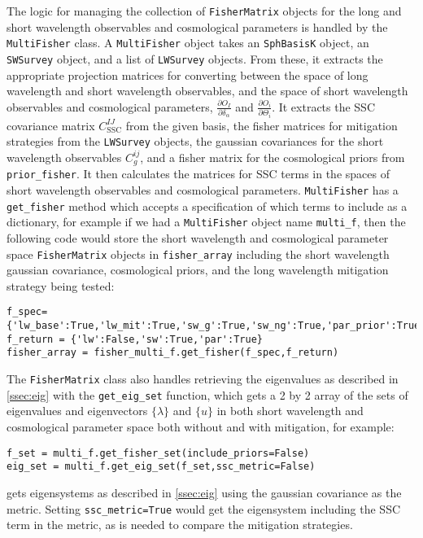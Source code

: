 \documentclass[a4paper,11pt]{article}
\begin{document}
The logic for managing the collection of \texttt{FisherMatrix} objects for the long and short wavelength observables and cosmological parameters is handled by the \texttt{MultiFisher} class. A \texttt{MultiFisher} object takes an \texttt{SphBasisK} object, an \texttt{SWSurvey} object, and a list of \texttt{LWSurvey} objects. From these, it extracts the appropriate projection matrices for converting between the space of long wavelength and short wavelength observables, and the space of short wavelength observables and cosmological parameters, $\frac{\partial O_{I}}{\partial\delta_\alpha}$ and $\frac{\partial O_i}{\partial\Theta_i}$. It extracts the SSC covariance matrix $C^{IJ}_{\text{SSC}}$ from the given basis, the fisher matrices for mitigation strategies from the \texttt{LWSurvey} objects, the gaussian covariances for the short wavelength observables $C^{ij}_g$, and a fisher matrix for the cosmological priors from \texttt{prior\_fisher}. It then calculates the matrices for SSC terms in the spaces of short wavelength observables and cosmological parameters. \texttt{MultiFisher} has a \texttt{get\_fisher} method which accepts a specification of which terms to include as a dictionary, for example if we had a \texttt{MultiFisher} object name \texttt{multi\_f}, then the following code would store the short wavelength and cosmological parameter space \texttt{FisherMatrix} objects in \texttt{fisher\_array} including the short wavelength gaussian covariance, cosmological priors, and the long wavelength mitigation strategy being tested:
\begin{verbatim}
f_spec={'lw_base':True,'lw_mit':True,'sw_g':True,'sw_ng':True,'par_prior':True}
f_return = {'lw':False,'sw':True,'par':True}
fisher_array = fisher_multi_f.get_fisher(f_spec,f_return)
\end{verbatim}
The \texttt{FisherMatrix} class also handles retrieving the eigenvalues as described in \ref{ssec:eig} with the \texttt{get\_eig\_set} function, which gets a 2 by 2 array of the sets of eigenvalues and eigenvectors $\{\lambda\}$ and $\{u\}$ in both short wavelength and cosmological parameter space both without and with mitigation, for example:

\begin{verbatim}
f_set = multi_f.get_fisher_set(include_priors=False)
eig_set = multi_f.get_eig_set(f_set,ssc_metric=False)
\end{verbatim}
gets eigensystems as described in \ref{ssec:eig} using the gaussian covariance as the metric. Setting \texttt{ssc\_metric=True} would get the eigensystem including the SSC term in the metric, as is needed to compare the mitigation strategies.
\end{document}
